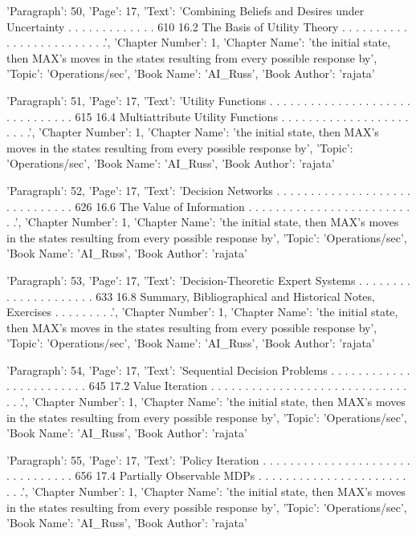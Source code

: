 {'Paragraph': 50, 'Page': 17, 'Text': 'Combining Beliefs and Desires under Uncertainty . . . . . . . . . . . . . 610 16.2 The Basis of Utility Theory . . . . . . . . . . . . . . . . . . . . . . . . .', 'Chapter Number': 1, 'Chapter Name': 'the initial state, then MAX’s moves in the states resulting from every possible response by', 'Topic': 'Operations/sec', 'Book Name': 'AI_Russ', 'Book Author': 'rajata'}

{'Paragraph': 51, 'Page': 17, 'Text': 'Utility Functions . . . . . . . . . . . . . . . . . . . . . . . . . . . . . . . 615 16.4 Multiattribute Utility Functions . . . . . . . . . . . . . . . . . . . . . . .', 'Chapter Number': 1, 'Chapter Name': 'the initial state, then MAX’s moves in the states resulting from every possible response by', 'Topic': 'Operations/sec', 'Book Name': 'AI_Russ', 'Book Author': 'rajata'}

{'Paragraph': 52, 'Page': 17, 'Text': 'Decision Networks . . . . . . . . . . . . . . . . . . . . . . . . . . . . . . 626 16.6 The Value of Information . . . . . . . . . . . . . . . . . . . . . . . . . .', 'Chapter Number': 1, 'Chapter Name': 'the initial state, then MAX’s moves in the states resulting from every possible response by', 'Topic': 'Operations/sec', 'Book Name': 'AI_Russ', 'Book Author': 'rajata'}

{'Paragraph': 53, 'Page': 17, 'Text': 'Decision-Theoretic Expert Systems . . . . . . . . . . . . . . . . . . . . . 633 16.8 Summary, Bibliographical and Historical Notes, Exercises . . . . . . . . .', 'Chapter Number': 1, 'Chapter Name': 'the initial state, then MAX’s moves in the states resulting from every possible response by', 'Topic': 'Operations/sec', 'Book Name': 'AI_Russ', 'Book Author': 'rajata'}

{'Paragraph': 54, 'Page': 17, 'Text': 'Sequential Decision Problems . . . . . . . . . . . . . . . . . . . . . . . . 645 17.2 Value Iteration . . . . . . . . . . . . . . . . . . . . . . . . . . . . . . . .', 'Chapter Number': 1, 'Chapter Name': 'the initial state, then MAX’s moves in the states resulting from every possible response by', 'Topic': 'Operations/sec', 'Book Name': 'AI_Russ', 'Book Author': 'rajata'}

{'Paragraph': 55, 'Page': 17, 'Text': 'Policy Iteration . . . . . . . . . . . . . . . . . . . . . . . . . . . . . . . . 656 17.4 Partially Observable MDPs . . . . . . . . . . . . . . . . . . . . . . . . .', 'Chapter Number': 1, 'Chapter Name': 'the initial state, then MAX’s moves in the states resulting from every possible response by', 'Topic': 'Operations/sec', 'Book Name': 'AI_Russ', 'Book Author': 'rajata'}

